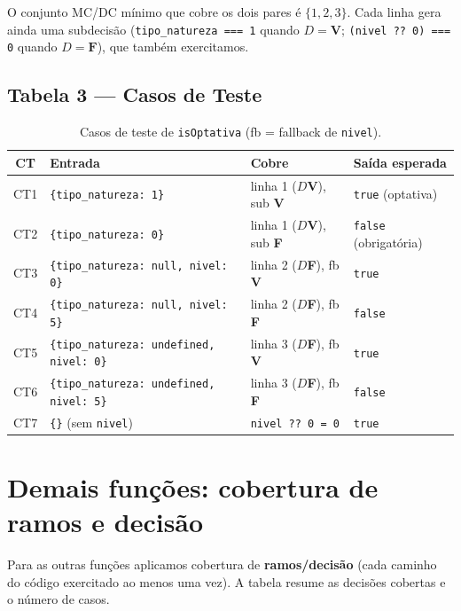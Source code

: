 \documentclass[11pt,a4paper]{article}
\newcommand{\V}{\textbf{V}}
\newcommand{\Ff}{\textbf{F}}
\begin{document}
O conjunto MC/DC mínimo que cobre os dois pares é $\{1, 2, 3\}$. Cada linha gera
ainda uma subdecisão (\texttt{tipo\_natureza === 1} quando $D=\V$;
\texttt{(nivel ?? 0) === 0} quando $D=\Ff$), que também exercitamos.

\subsection*{Tabela 3 --- Casos de Teste}

\begin{table}[h]
\centering
\small
\begin{tabular}{@{}clll@{}}
\toprule
\textbf{CT} & \textbf{Entrada} & \textbf{Cobre} & \textbf{Saída esperada} \\
\midrule
CT1 & \texttt{\{tipo\_natureza: 1\}}                & linha 1 ($D$\V), sub \V & \texttt{true} (optativa) \\
CT2 & \texttt{\{tipo\_natureza: 0\}}                & linha 1 ($D$\V), sub \Ff & \texttt{false} (obrigatória) \\
CT3 & \texttt{\{tipo\_natureza: null, nivel: 0\}}   & linha 2 ($D$\Ff), fb \V  & \texttt{true} \\
CT4 & \texttt{\{tipo\_natureza: null, nivel: 5\}}   & linha 2 ($D$\Ff), fb \Ff & \texttt{false} \\
CT5 & \texttt{\{tipo\_natureza: undefined, nivel: 0\}} & linha 3 ($D$\Ff), fb \V & \texttt{true} \\
CT6 & \texttt{\{tipo\_natureza: undefined, nivel: 5\}} & linha 3 ($D$\Ff), fb \Ff & \texttt{false} \\
CT7 & \texttt{\{\}} (sem \texttt{nivel})            & \texttt{nivel ?? 0 = 0}  & \texttt{true} \\
\bottomrule
\end{tabular}
\caption{Casos de teste de \texttt{isOptativa} (fb = fallback de \texttt{nivel}).}
\end{table}

\section{Demais funções: cobertura de ramos e decisão}

Para as outras funções aplicamos cobertura de \textbf{ramos/decisão} (cada
caminho do código exercitado ao menos uma vez). A tabela resume as decisões
cobertas e o número de casos.
\end{document}
